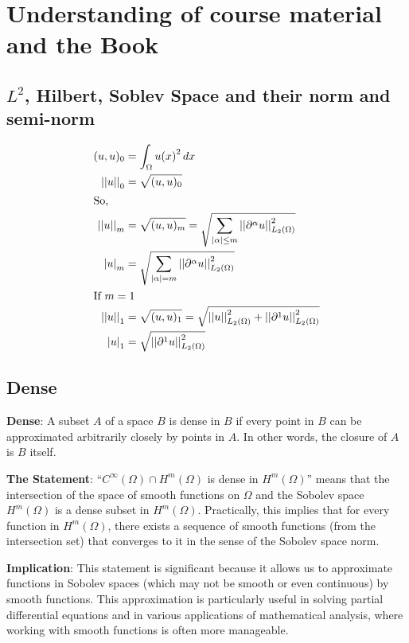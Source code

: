 \documentclass[a4paper,12pt]{article} %
\begin{document}
\setlength{\parskip}{1em} 
\setlength{\parindent}{0pt}
\section{\textbf{Understanding of course material and the Book}}

\subsection{$L^2$, Hilbert, Soblev Space and their norm and semi-norm }
\begin{align*}
   (u,u)_0 &= \int_{\Omega} {u(x)}^2 \,dx\ \\
   {||u||}_0 &= \sqrt {(u,u)_0} \\
   \intertext{So,}
   {||u||}_m &= \sqrt {(u,u)_m} = \sqrt {\sum_{|\alpha| \leq m} {||{\partial}^{\alpha} u||}^2_{L_2(\Omega)}}\\
   {|u|}_m &= \sqrt {\sum_{|\alpha| = m} {||{\partial}^{\alpha} u||}^2_{L_2(\Omega)}}\\
   \intertext{If $m=1$}
   {||u||}_1 &= \sqrt {(u,u)_1} = \sqrt {{{||u||}^2_{L_2(\Omega)}} + {||{\partial}^{1} u||}^2_{L_2(\Omega)}}\\
   {|u|}_1 &= \sqrt {{||{\partial}^{1} u||}^2_{L_2(\Omega)}}
\end{align*}

\subsection{Dense}
\textbf{Dense}: A subset \( A \) of a space \( B \) is dense in \( B \) if every point in \( B \) can be approximated arbitrarily closely by points in \( A \). In other words, the closure of \( A \) is \( B \) itself.

\textbf{The Statement}: ``\( C^\infty(\Omega) \cap H^m(\Omega) \) is dense in \( H^m(\Omega) \)'' means that the intersection of the space of smooth functions on \( \Omega \) and the Sobolev space \( H^m(\Omega) \) is a dense subset in \( H^m(\Omega) \). Practically, this implies that for every function in \( H^m(\Omega) \), there exists a sequence of smooth functions (from the intersection set) that converges to it in the sense of the Sobolev space norm.

\textbf{Implication}: This statement is significant because it allows us to approximate functions in Sobolev spaces (which may not be smooth or even continuous) by smooth functions. This approximation is particularly useful in solving partial differential equations and in various applications of mathematical analysis, where working with smooth functions is often more manageable.
\end{document}
